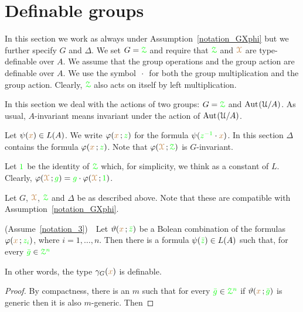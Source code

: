 \section{Definable groups}\label{definablegroups}

In this section we work as always under Assumption~\ref{notation_GXphi} but we further specify $G$ and $\Delta$.
We set $G={\color{green}\EuScript Z}$ and require that ${\color{green}\EuScript Z}$ and ${\color{brown}\EuScript X}$ are type-definable over $A$.
We assume that the group operations and the group action are definable over $A$.
We use the symbol $\,\cdot\,$ for both the group multiplication and the group action.
Clearly, ${\color{green}\EuScript Z}$ also acts on itself by left multiplication.

In this section we deal with the actions of two groups: $G={\color{green}\EuScript Z}$ and ${\rm Aut\kern.15ex}(\EuScript U/A)$.
As usual, $A$-invariant means invariant under the action of ${\rm Aut\kern.15ex}(\EuScript U/A)$.

Let $\psi({\color{brown} x})\in L(A)$.
We write $\varphi({\color{brown} x}\,;{\color{green} z})$ for the formula $\psi({\color{green} z^{-1}}\cdot{\color{brown}x})$.
In this section $\Delta$ contains the formula $\varphi({\color{brown} x}\,;{\color{green} z})$.
Note that $\varphi({\color{brown}\EuScript X}\,;{\color{green}\EuScript Z})$ is $G$-invariant.

Let ${\color{green} 1}$ be the identity of ${\color{green}\EuScript Z}$ which, for simplicity, we think as a constant of $L$.
Clearly, $\varphi({\color{brown}\EuScript X}\,;{\color{green} g})={\color{green} g}\cdot\varphi({\color{brown}\EuScript X}\,;{\color{green} 1})$.

\begin{assumption}\label{notation_3}
  Let $G$, ${\color{brown}\EuScript X}$, ${\color{green}\EuScript Z}$ and $\Delta$ be as described above.
  Note that these are compatible with Assumption~\ref{notation_GXphi}.
\end{assumption}

\begin{fact}
  (Assume~\ref{notation_3})\ \ 
  Let $\vartheta({\color{brown} x}\,;{\color{green}\bar z})$ be a Bolean combination of the formulas $\varphi({\color{brown} x}\,;{\color{green} z_i})$, where $i=1,\dots,n$. 
  Then there is a formula $\psi({\color{green}\bar z})\in L(A)$ such that, for every  ${\color{green}\bar g}\in{\color{green}\EuScript Z^n}$


  In other words, the type $\gamma_G({\color{brown} x})$ is definable.
\end{fact}

\begin{proof}
  By compactness, there is an $m$ such that for every ${\color{green}\bar g}\in{\color{green}\EuScript Z^n}$ if $\vartheta({\color{brown} x}\,;{\color{green}\bar g})$ is generic then it is also $m$-generic.
  Then

\end{proof}

